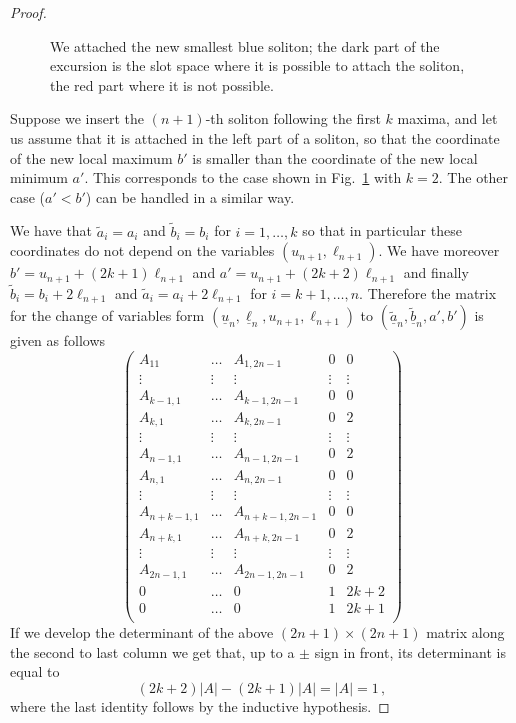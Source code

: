 \documentclass[10pt,a4paper]{amsart}
\begin{document}
\begin{proof}
\begin{figure}
	
	\caption{We attached the new smallest blue soliton; the dark part of the excursion is the slot space where it is possible to attach the soliton, the red part where it is not possible. }
	
	\label{transform}
\end{figure}

Suppose we insert the $(n+1)$-th soliton following the first $k$ maxima, and let us assume that it is attached in the left part of a soliton, so that the coordinate of the new local maximum $b'$ is smaller than the coordinate of the new local minimum $a'$.
This corresponds to the case shown in Fig.~\ref{transform} with $k=2$. The other case ($a'<b'$) can be handled in a similar way.

We have that $\tilde a_i=a_i$ and $\tilde b_i=b_i$ for $i=1,\dots , k$ so that in particular these coordinates do not depend on the variables $(u_{n+1},\ell_{n+1})$. We have moreover $b'=u_{n+1}+(2k+1)\ell_{n+1}$ and $a'=u_{n+1}+(2k+2)\ell_{n+1}$
and finally $\tilde b_i=b_i+2\ell_{n+1}$ and $\tilde a_i=a_i+2\ell_{n+1}$ for $i=k+1,\dots , n$. Therefore the matrix for the change of variables form $(\underline u_n,\underline \ell_n, u_{n+1}, \ell_{n+1})$ to $(\tilde{\underline a}_n, \tilde{\underline b}_n, a',b')$ is given as follows
\[
\left(\begin{matrix}
	A_{11}& \dots & A_{1,2n-1} & 0 & 0 \\
	\vdots & \vdots & \vdots & \vdots & \vdots \\
	A_{k-1,1} & \dots & A_{k-1,2n-1} & 0 & 0 \\
	A_{k,1} & \dots & A_{k,2n-1} & 0 & 2\\
	\vdots & \vdots & \vdots & \vdots & \vdots \\
	A_{n-1,1} & \dots & A_{n-1,2n-1} & 0 & 2 \\
	A_{n,1} & \dots & A_{n,2n-1} & 0 & 0\\
	\vdots & \vdots & \vdots & \vdots & \vdots \\
	A_{n+k-1,1} & \dots & A_{n+k-1,2n-1} & 0 & 0 \\
	A_{n+k,1} & \dots & A_{n+k, 2n-1} & 0 & 2\\
	\vdots & \vdots & \vdots & \vdots & \vdots \\
	A_{2n-1,1} & \dots & A_{2n-1,2n-1} & 0 & 2 \\
	0 & \dots & 0 & 1 & 2k+2 \\
	0 & \dots & 0 & 1 &  2k+1\\
\end{matrix}\right)
\]
If we develop the determinant of the above $(2n+1)\times (2n+1)$ matrix along the second to last column we get that, up to a $\pm$ sign in front, its determinant is equal to
\[
(2k+2)|A|-(2k+1)|A|=|A|=1\,,
\]
where the last identity follows by the inductive hypothesis.	
		

\end{proof}
\end{document}
